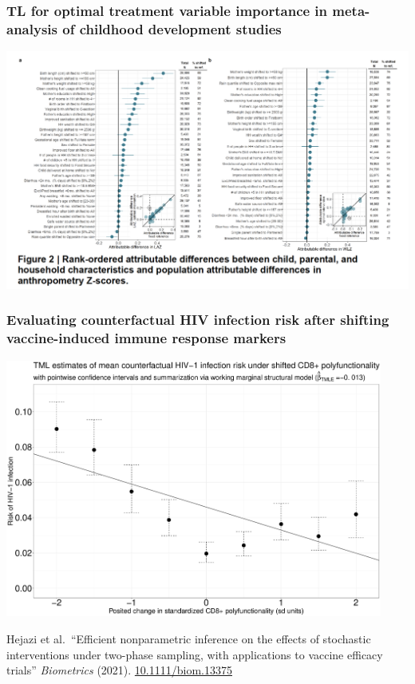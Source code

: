 \documentclass[t]{beamer}
\begin{document}
\begin{frame}
  \frametitle{TL for optimal treatment variable importance in meta-analysis of
  childhood development studies}
  \vspace{-1em}
  \begin{center}
  \includegraphics[width=1.03\textwidth] {figures/NatureChildDevCons,png}\hspace*{6cm}
  \end{center}
\end{frame}

\begin{frame}
  \frametitle{Evaluating counterfactual HIV infection risk after shifting
  vaccine-induced immune response markers}
  \vspace{-2em}
  \begin{center}
  \includegraphics[width=0.93\textwidth] {figures/HejaziShiftCD8_2021.pdf}\hspace*{4cm}
  \end{center}
  \scriptsize{
  Hejazi et al.~``Efficient nonparametric inference on the effects of stochastic
  interventions under two-phase sampling, with applications to vaccine efficacy
  trials'' \textit{Biometrics} (2021).
  \href{https://doi.org/10.1111/biom.13375}{10.1111/biom.13375}}
\end{frame}
\end{document}

